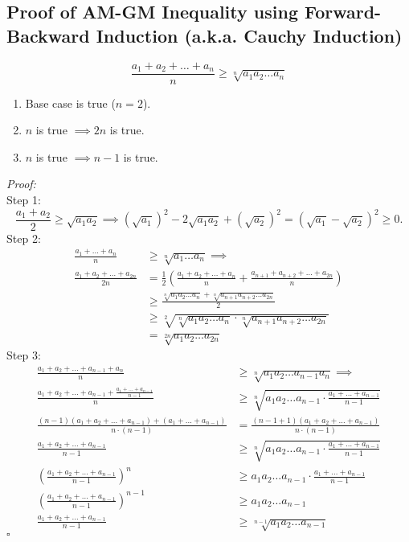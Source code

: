 \documentclass[a4paper,11pt]{article}
\begin{document}
\subsection{Proof of AM-GM Inequality using Forward-Backward Induction (a.k.a. Cauchy Induction)}
\begin{tcolorbox}[breakable]
    \[
    \frac{a_1 + a_2 + \dots + a_n}{n} \geq \sqrt[n]{a_1 a_2 \dots a_n}
    \]
    \begin{enumerate}[label=\roman*.]
        \item Base case is true ($n=2$).
        \item $n$ is true $\implies 2n$ is true.
        \item $n$ is true $\implies n-1$ is true.
    \end{enumerate}
    \emph{Proof:} \\[6pt]
    Step 1:
    \[
    \frac{a_1 + a_2}{2} \geq \sqrt{a_1 a_2} \implies (\sqrt{a_1})^2 - 2\sqrt{a_1 a_2} + (\sqrt{a_2})^2 = (\sqrt{a_1} - \sqrt{a_2})^2 \geq 0.
    \]
    Step 2:
    \begin{align*}
        \frac{a_1 + \dots + a_n}{n} &\geq \sqrt[n]{a_1 \dots a_n} \implies\\
        \frac{a_1 + a_2 + \dots + a_{2n}}{2n} &= \frac{1}{2} \left( \frac{a_1 + a_2 + \dots + a_n}{n} + \frac{a_{n+1} + a_{n+2} + \dots + a_{2n}}{n} \right) \\  
        &\geq \frac{ \sqrt[n]{a_1 a_2 \dots a_n} + \sqrt[n]{a_{n+1} a_{n+2} \dots a_{2n}}}{2} \\
        &\geq \sqrt[2]{\sqrt[n]{a_1 a_2 \dots a_n} \cdot \sqrt[n]{a_{n+1} a_{n+2} \dots a_{2n}}} \\
        &= \sqrt[2n]{a_1 a_2 \dots a_{2n}} 
    \end{align*}
    Step 3:
    \begin{align*}
        \frac{a_1 + a_2 + \dots + a_{n-1} + a_n}{n} &\geq \sqrt[n]{a_1 a_2 \dots a_{n-1} a_n} \implies \\
        \frac{a_1 + a_2 + \dots + a_{n-1} +  \frac{a_1 + \dots + a_{n-1}}{n-1}}{n} &\geq \sqrt[n]{a_1 a_2 \dots a_{n-1} \cdot \frac{a_1 + \dots + a_{n-1}}{n-1}} \\
        \frac{(n-1)(a_1 + a_2 + \dots + a_{n-1}) + (a_1 + \dots + a_{n-1})}{n \cdot (n-1)} &= \frac{(n-1+1)(a_1 + a_2 + \dots + a_{n-1})}{n \cdot (n-1)} \\
        \frac{a_1 + a_2 + \dots + a_{n-1}}{n-1} &\geq \sqrt[n]{a_1 a_2 \dots a_{n-1} \cdot \frac{a_1 + \dots + a_{n-1}}{n-1}} \\
        \left( \frac{a_1 + a_2 + \dots + a_{n-1}}{n-1} \right)^n &\geq a_1 a_2 \dots a_{n-1} \cdot \frac{a_1 + \dots + a_{n-1}}{n-1} \\
        \left( \frac{a_1 + a_2 + \dots + a_{n-1}}{n-1} \right)^{n-1} &\geq a_1 a_2 \dots a_{n-1} \\
        \frac{a_1 + a_2 + \dots + a_{n-1}}{n-1} &\geq \sqrt[n-1]{a_1 a_2 \dots a_{n-1}}
    \end{align*}  
    \hfill$\square$
\end{tcolorbox}
\end{document}
